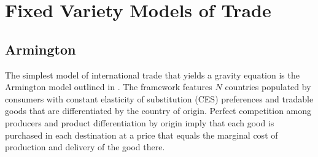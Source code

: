 \documentclass[12pt,dvips, ps2pdf]{article}
\begin{document}
%
%






\section{Fixed Variety Models of Trade}

\subsection{Armington}
The simplest model of international trade that yields a gravity equation is the Armington model outlined in \citet{aw03}. The framework features $N$ countries populated by consumers with constant elasticity of substitution (CES) preferences and tradable goods that are differentiated by the country of origin. Perfect competition among producers and product differentiation by origin imply that each good is purchased in each destination at a price that equals the marginal cost of production and delivery of the good there.
\end{document}

